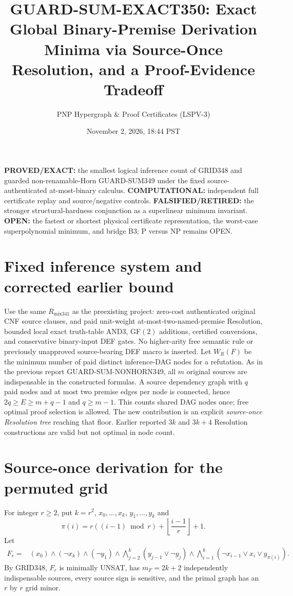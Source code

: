 \documentclass[11pt]{article}
\title{GUARD-SUM-EXACT350: Exact Global Binary-Premise Derivation Minima via Source-Once Resolution, and a Proof-Evidence Tradeoff}
\author{PNP Hypergraph \& Proof Certificates (LSPV-3)}
\date{November 2, 2026, 18:44 PST}
\begin{document}
\maketitle
\noindent\textbf{PROVED/EXACT:} the smallest logical inference count of GRID348 and guarded non-renamable-Horn GUARD-SUM349 under the fixed source-authenticated at-most-binary calculus. \textbf{COMPUTATIONAL:} independent full certificate replay and source/negative controls. \textbf{FALSIFIED/RETIRED:} the stronger structural-hardness conjunction as a superlinear minimum invariant. \textbf{OPEN:} the fastest or shortest physical certificate representation, the worst-case superpolynomial minimum, and bridge B3; P versus NP remains OPEN.

\section*{Fixed inference system and corrected earlier bound}
Use the same $R_{\mathrm{mix341}}$ as the preexisting project: zero-cost authenticated original CNF source clauses, and paid unit-weight at-most-two-named-premise Resolution, bounded local exact truth-table AND3, GF$(2)$ additions, certified conversions, and conservative binary-input DEF gates. No higher-arity free semantic rule or previously unapproved source-bearing DEF macro is inserted. Let $W_R(F)$ be the minimum number of paid distinct inference-DAG nodes for a refutation. As in the previous report GUARD-SUM-NONHORN349, all $m$ original sources are indispensable in the constructed formulas. A source dependency graph with $q$ paid nodes and at most two premise edges per node is connected, hence $2q\ge E\ge m+q-1$ and $q\ge m-1$. This counts shared DAG nodes once; free optimal proof selection is allowed. The new contribution is an explicit \emph{source-once Resolution tree} reaching that floor. Earlier reported $3k$ and $3k+4$ Resolution constructions are valid but not optimal in node count.

\section*{Source-once derivation for the permuted grid}
For integer $r\ge2$, put $k=r^2$, $x_0,\ldots,x_k$, $y_1,\ldots,y_k$ and
\[
\pi(i)=r((i-1)\bmod r)+\left\lfloor\frac{i-1}{r}\right\rfloor+1.
\]
Let
\[
\begin{split}
F_r={}&(x_0)\wedge(\neg x_k)\wedge(\neg y_1)
\wedge\!\!\bigwedge_{j=2}^{k}(y_{j-1}\vee\neg y_j)
\wedge\!\!\bigwedge_{i=1}^{k}(\neg x_{i-1}\vee x_i\vee y_{\pi(i)}).
\end{split}
\]
By GRID348, $F_r$ is minimally UNSAT, has $m_F=2k+2$ independently indispensable sources, every source sign is sensitive, and the primal graph has an $r$ by $r$ grid minor.
\end{document}
